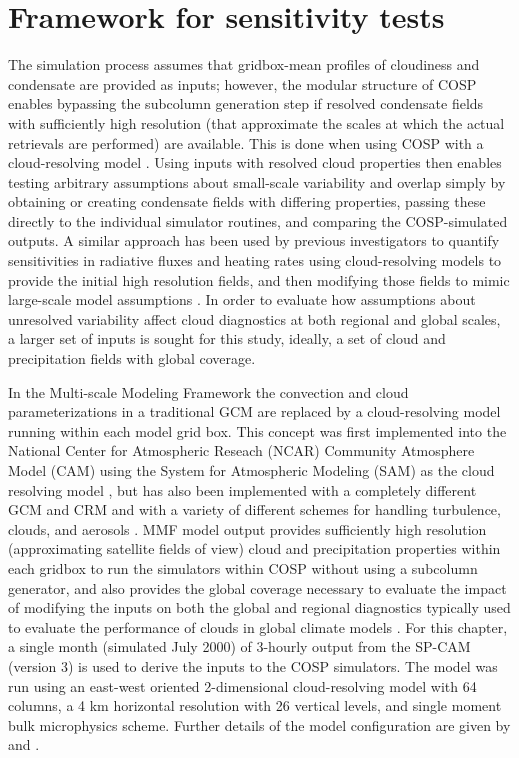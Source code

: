 \section{Framework for sensitivity tests}\label{sec:subgrid1Framework}

The simulation process assumes that gridbox-mean profiles of cloudiness
and condensate are provided as inputs; however, the modular structure of
COSP enables bypassing the subcolumn generation step if resolved
condensate fields with sufficiently high resolution (that approximate
the scales at which the actual retrievals are performed) are available.
This is done when using COSP with a cloud-resolving model
\citep{marchand_et_al_2009, marchand_and_ackerman_2010}. Using inputs
with resolved cloud properties then enables testing arbitrary
assumptions about small-scale variability and overlap simply by
obtaining or creating condensate fields with differing properties,
passing these directly to the individual simulator routines, and
comparing the COSP-simulated outputs. A similar approach has been used
by previous investigators to quantify sensitivities in radiative fluxes
and heating rates using cloud-resolving models to provide the initial
high resolution fields, and then modifying those fields to mimic
large-scale model assumptions
\citep{barker_et_al_1999, wu_and_liang_2005}. In order to evaluate how
assumptions about unresolved variability affect cloud diagnostics at
both regional and global scales, a larger set of inputs is sought for
this study, ideally, a set of cloud and precipitation fields with global
coverage.

In the Multi-scale Modeling Framework \citep[MMF;][]{randall_et_al_2003}
the convection and cloud parameterizations in a traditional GCM are
replaced by a cloud-resolving model running within each model grid box.
This concept was first implemented into the National Center for
Atmospheric Reseach (NCAR) Community Atmosphere Model (CAM) using the
System for Atmospheric Modeling (SAM) as the cloud resolving model
\citep[SP-CAM;][]{khairoutdinov_and_randall_2001}, but has also been
implemented with a completely different GCM and CRM
\citep{tao_et_al_2009} and with a variety of different schemes for
handling turbulence, clouds, and aerosols
\citep[e.g.,][]{cheng_and_xu_2011, cheng_and_xu_2013}. MMF model output
provides sufficiently high resolution (approximating satellite fields of
view) cloud and precipitation properties within each gridbox to run the
simulators within COSP without using a subcolumn generator, and also
provides the global coverage necessary to evaluate the impact of
modifying the inputs on both the global and regional diagnostics
typically used to evaluate the performance of clouds in global climate
models \citep[e.g.,][]{gleckler_et_al_2008}. For this chapter, a single
month (simulated July 2000) of 3-hourly output from the SP-CAM (version
3) is used to derive the inputs to the COSP simulators. The model was
run using an east-west oriented 2-dimensional cloud-resolving model with
64 columns, a 4 km horizontal resolution with 26 vertical levels, and
single moment bulk microphysics scheme. Further details of the model
configuration are given by \citet{khairoutdinov_et_al_2005} and
\citet{marchand_et_al_2009}.

